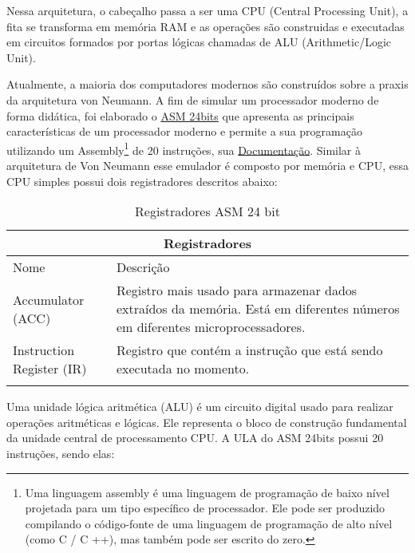 Nessa arquitetura, o cabeçalho passa a ser uma CPU (Central Processing Unit), a fita se transforma em memória RAM e as operações são construidas e executadas em circuitos formados por portas lógicas  chamadas de ALU (Arithmetic/Logic Unit). \cite{12}

Atualmente, a maioria dos computadores modernos são construídos sobre a praxis da arquitetura von Neumann. A fim de simular um processador moderno de forma didática, foi elaborado o \href{https://gzsig.io/vm-24bits/}{ASM 24bits} que apresenta as principais características de um processador moderno e permite a sua programação utilizando um Assembly\footnote{Uma linguagem assembly é uma linguagem de programação de baixo nível projetada para um tipo específico de processador. Ele pode ser produzido compilando o código-fonte de uma linguagem de programação de alto nível (como C / C ++), mas também pode ser escrito do zero.} de 20 instruções, sua \href{https://github.com/gzsig/Asm/blob/master/README.md}{Documentação}. Similar à arquitetura de Von Neumann esse emulador é composto por memória e CPU, essa CPU simples possui dois registradores descritos abaixo:

\vspace{1cm}
\begin{longtable}{ |p{3cm}||p{11cm}|  }
  \hline
  \multicolumn{2}{|c|}{Registradores} \\
  \hline
    Nome &
    Descrição\\
  \hline
    Accumulator (ACC) &
    Registro mais usado para armazenar dados extraídos da memória. Está em diferentes números em diferentes microprocessadores. \\
  \hline
    Instruction Register (IR) &
    Registro que contém a instrução que está sendo executada no momento. \\
  \hline
  \caption{Registradores ASM 24 bit}
  \label{table:1}
\end{longtable}
\vspace{1cm}

Uma unidade lógica aritmética (ALU) é um circuito digital usado para realizar operações aritméticas e lógicas. Ele representa o bloco de construção fundamental da unidade central de processamento CPU. A ULA do ASM 24bits possui 20 instruções, sendo elas:

